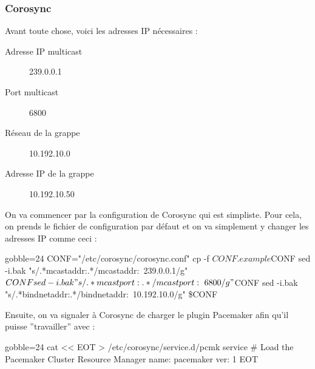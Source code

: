 \documentclass[11pt,a4paper]{report}
\begin{document}
                \subsubsection{Corosync}
                
                    Avant toute chose, voici les adresses IP nécessaires :\\

                    \begin{description}
                        \item[Adresse IP multicast] 239.0.0.1
                        \item[Port multicast] 6800
                        \item[Réseau de la grappe] 10.192.10.0
                        \item[Adresse IP de la grappe] 10.192.10.50
                    \end{description}

                    On va commencer par la configuration de Corosync qui est simpliste. Pour cela, on prends le fichier de configuration par défaut et on va simplement y changer les adresses IP comme ceci :\\

                    \begin{bashcode*}{gobble=24}
                        CONF="/etc/corosync/corosync.conf"
                        cp -f $CONF.example $CONF
                        sed -i.bak "s/.*mcastaddr:.*/mcastaddr:\ 239.0.0.1/g" $CONF
                        sed -i.bak "s/.*mcastport:.*/mcastport:\ 6800/g" $CONF
                        sed -i.bak "s/.*bindnetaddr:.*/bindnetaddr:\ 10.192.10.0/g" \$CONF
                    \end{bashcode*}

                    Ensuite, on va signaler à Corosync de charger le plugin Pacemaker afin qu'il puisse ''travailler'' avec :\\

                    \begin{bashcode*}{gobble=24}
                        cat << EOT > /etc/corosync/service.d/pcmk
                        service {
                                # Load the Pacemaker Cluster Resource Manager
                                name: pacemaker
                                ver:  1
                        }
                        EOT
                    \end{bashcode*}
\end{document}

